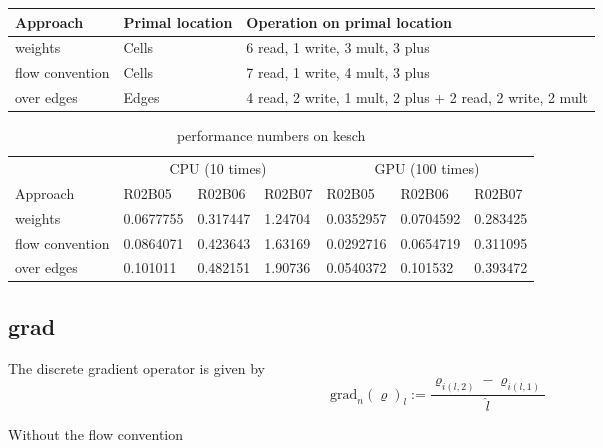\documentclass[12pt]{article}
\begin{document}
\begin{table}[htbp]
\centering
\begin{tabular}{lll}
\toprule
Approach & Primal location & Operation on primal location\\
\midrule
weights & Cells & 6 read, 1 write, 3 mult, 3 plus\\
flow convention & Cells & 7 read, 1 write, 4 mult, 3 plus\\
over edges & Edges & 4 read, 2 write, 1 mult, 2 plus + 2 read, 2 write, 2 mult\\
\bottomrule
\end{tabular}
\end{table}

\begin{table}[htbp]
\centering
\begin{tabular}{llll|lll}
\toprule
& \multicolumn {3}{c}{CPU (10 times)} & \multicolumn {3}{c}{GPU (100 times)}\\
\cmidrule {2-7}
Approach & R02B05 & R02B06 & R02B07 & R02B05 & R02B06 & R02B07\\
\midrule
weights & 0.0677755 & 0.317447& 1.24704 & 0.0352957& 0.0704592& 0.283425\\
flow convention & 0.0864071 & 0.423643& 1.63169 & 0.0292716& 0.0654719& 0.311095\\
over edges & 0.101011 & 0.482151& 1.90736 & 0.0540372& 0.101532& 0.393472\\
\bottomrule
\end{tabular}
\caption{performance numbers on kesch}
\end{table}

\subsection{grad}
The discrete gradient operator is given by
\begin{equation}
  \text{grad}_n(\varrho)_l:=\frac{\varrho_{i(l,2)}-\varrho_{i(l,1)}}{\hat{l}}
\end{equation}

Without the flow convention
\end{document}
